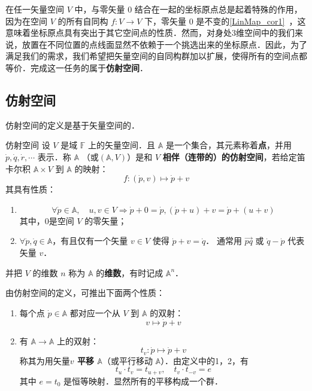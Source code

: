 
\begin{issues}
\issueTODO
\end{issues}

在任一矢量空间 $V$ 中，与零矢量 $0$ 结合在一起的坐标原点总是起着特殊的作用，因为在空间 $V$ 的所有自同构 $f:V\rightarrow V$ 下，零矢量 $0$ 是不变的\autoref{LinMap_cor1}~，这意味着坐标原点具有突出于其它空间点的性质．然而，对身处3维空间中的我们来说，放置在不同位置的点线面显然不依赖于一个挑选出来的坐标原点．因此，为了满足我们的需求，我们希望把矢量空间的自同构群加以扩展，使得所有的空间点都等价．完成这一任务的属于\textbf{仿射空间}．
\subsection{仿射空间}
仿射空间的定义是基于矢量空间的．
\begin{definition}{仿射空间}
设 $V$ 是域 $\mathbb F$ 上的矢量空间．且 $\mathbb A$ 是一个集合，其元素称着\textbf{点}，并用 $\dot{p},\dot{q},\dot{r},\cdots$ 表示．称 $\mathbb A$ （或$(\mathbb A,V)$）是和 $V$ \textbf{相伴（连带的）的仿射空间}，若给定笛卡尔积 $\mathbb A\times V$ 到 $\mathbb A$ 的映射：
\begin{equation}
f:(\dot p,v)\mapsto\dot p+v
\end{equation}
其具有性质：
\begin{enumerate}
\item \begin{equation}
\forall \dot p\in\mathbb A,\quad u,v\in V\Rightarrow\dot p+0=\dot p,(\dot p+u)+v=\dot p+(u+v)
\end{equation}
其中，0是空间 $V$ 的零矢量；
\item $\forall \dot p,\dot q\in\mathbb A$，有且仅有一个矢量 $v\in V$ 使得 $\dot p+v=\dot q$． 通常用 $\vec{pq}$ 或 $\dot q-\dot p$ 代表矢量 $v$．
\end{enumerate}
并把 $V$ 的维数 $n$ 称为 $\mathbb A$ 的\textbf{维数}，有时记成 $\mathbb A^n$．
\end{definition}
由仿射空间的定义，可推出下面两个性质：
\begin{enumerate}
\item 每个点 $\dot p\in \mathbb A$ 都对应一个从 $V$ 到 $\mathbb A$ 的双射：
\begin{equation}
v\mapsto \dot p+v
\end{equation}

\item 有 $\mathbb A\rightarrow\mathbb A$ 上的双射：
\begin{equation}
t_v:\dot p\mapsto\dot p+v
\end{equation}
 称其为用矢量\textbf{$v$ 平移 $\mathbb A$}（或平行移动 $\mathbb A$）．由定义中的1，2，有
 \begin{equation}
 t_u\cdot t_v=t_{u+v},\quad t_v\cdot t_{-v}=e
 \end{equation}
  其中 $e=t_0$ 是恒等映射．显然所有的平移构成一个群．
\end{enumerate}

